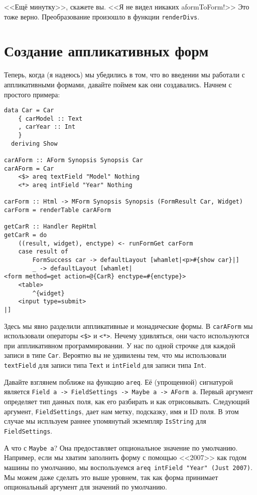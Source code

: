 <<Ещё минутку>>, скажете вы. <<Я не видел никаких aformToForm!>> Это тоже верно.
Преобразование произошло в функции \lstinline'renderDivs'.

\section{Создание аппликативных форм}
Теперь, когда (я надеюсь) мы убедились в том, что во введении мы работали с
аппликативными формами, давайте поймем как они создавались. Начнем с простого примера:

\begin{lstlisting}
data Car = Car
    { carModel :: Text
    , carYear :: Int
    }
  deriving Show

carAForm :: AForm Synopsis Synopsis Car
carAForm = Car
    <$> areq textField "Model" Nothing
    <*> areq intField "Year" Nothing

carForm :: Html -> MForm Synopsis Synopsis (FormResult Car, Widget)
carForm = renderTable carAForm

getCarR :: Handler RepHtml
getCarR = do
    ((result, widget), enctype) <- runFormGet carForm
    case result of
        FormSuccess car -> defaultLayout [whamlet|<p>#{show car}|]
        _ -> defaultLayout [whamlet|
<form method=get action=@{CarR} enctype=#{enctype}>
    <table>
        ^{widget}
    <input type=submit>
|]
\end{lstlisting}
Здесь мы явно разделили аппликативные и монадические формы. В \lstinline'carAForm' мы
использовали операторы \lstinline'<$>' и \lstinline'<*>'. Нечему удивляться, они
часто используются при аппликативном программировании. У нас по одной строчке для
каждой записи в типе \lstinline'Car'. Вероятно вы не удивилены тем, что мы использовали 
\lstinline'textField' для записи типа \lstinline'Text' и \lstinline'intField' для записи
типа \lstinline'Int'.

Давайте взглянем поближе на функцию \lstinline'areq'. Её (упрощенной) сигнатурой является
\lstinline'Field a -> FieldSettings -> Maybe a -> AForm a'. 
Первый аргумент определяет тип данных поля, как его разбирать и как отрисовывать.
Следующий аргумент, \lstinline'FieldSettings', дает нам метку, подсказку, имя и  ID
поля. В этом случае мы испльзуем раннее упомянутый экземпляр \lstinline'IsString' для 
\lstinline'FieldSettings'.

А что с \lstinline'Maybe a'? Она предоставляет опциональное значение по умолчанию. 
Например, если мы хватим заполнить форму с помощью <<2007>> как годом машины по
умолчанию, мы воспользуемся \lstinline'areq intField "Year" (Just 2007)'. Мы можем даже
сделать это выше уровнем, так как форма принимает опциональный аргумент для значений по
умолчанию.

